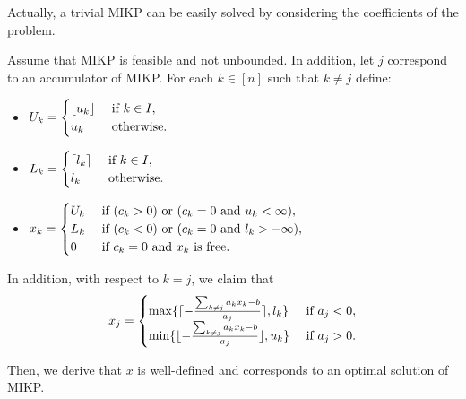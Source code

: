 \documentclass[a4paper,11pt]{article}
\begin{document}
Actually, a trivial MIKP can be easily solved by considering the coefficients of the problem. 
\begin{proposition}
Assume that MIKP is feasible and not unbounded. In addition, let $j$ correspond to an accumulator of MIKP. For each $k\in [n]$ such that $k\neq j$ define:
\begin{itemize}
\item $U_k=\begin{cases}
\lfloor u_k \rfloor &~\mbox{if}~ k\in I,\\
u_k &~\mbox{otherwise.}~
\end{cases}$
\item $L_k=\begin{cases}
\lceil l_k \rceil &~\mbox{if}~ k\in I,\\
l_k &~\mbox{otherwise.}~
\end{cases}$
\item $x_k=\begin{cases}
U_k &~\mbox{if}~(c_k>0)~\mbox{or}~(c_k=0~\mbox{and}~u_k<\infty),\\
L_k &~\mbox{if}~(c_k<0)~\mbox{or}~(c_k=0~\mbox{and}~l_k>-\infty),\\
0 &~\mbox{if}~ c_k=0 ~\mbox{and}~ x_k ~\mbox{is free.}~
\end{cases}$
\end{itemize}

In addition, with respect to $k=j$, we claim that
\begin{equation}
x_j=\begin{cases}
\max\{\lceil -\frac{\sum_{k\neq j}a_kx_k-b}{a_j}\rceil, l_k\} & ~\mbox{if}~ a_j<0,\\
\min\{\lfloor -\frac{\sum_{k\neq j}a_kx_k-b}{a_j}\rfloor, u_k\} & ~\mbox{if}~ a_j>0.\\
\end{cases}
\end{equation}

Then, we derive that $x$ is well-defined and corresponds to an optimal solution of MIKP.
\end{proposition}
\end{document}
